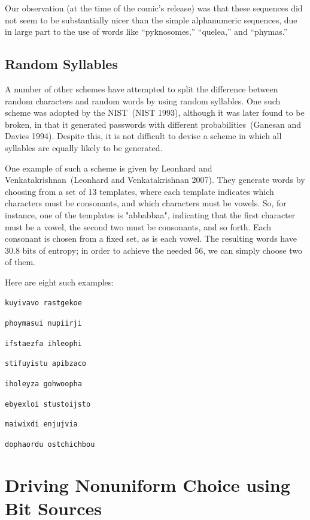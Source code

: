 \documentclass[preprint]{soups}
\newcommand{\sectionNewpage}{}
\newcommand{\Scribtexttt}[1]{{\texttt{#1}}}
\newenvironment{SingleColumn}{\begin{list}{}{\topsep=0pt\partopsep=0pt%
\listparindent=0pt\itemindent=0pt\labelwidth=0pt\leftmargin=0pt\rightmargin=0pt%
\itemsep=0pt\parsep=0pt}\item}{\end{list}}
\let\SOriginalthesubsection\thesubsection
\let\SOriginalthesubsubsection\thesubsubsection
\newcommand{\Ssection}[2]{\section[#1]{#2}\let\thesubsection\SOriginalthesubsection}
\newcommand{\Ssubsection}[2]{\subsection[#1]{#2}\let\thesubsubsection\SOriginalthesubsubsection}
\begin{document}
Our observation (at the time of the comic{'}s release) was
that these sequences did not seem to be substantially nicer
than the simple alphanumeric sequences, due in large part to
the use of words like {``}pyknosomes,{''} {``}quelea,{''} and
{``}phymas.{''}

\Ssubsection{Random Syllables}{Random Syllables}\label{t:x28part_x22Randomx5fSyllablesx22x29}

A number of other schemes have attempted to split the
difference between random characters and random words by
using random syllables. One such scheme was adopted by the
NIST~(NIST 1993), although it was later found to
be broken, in that it generated passwords with different
probabilities~(Ganesan and Davies 1994). Despite this, it is
not difficult to devise a scheme in which all syllables are
equally likely to be generated.

One example of such a scheme is given by Leonhard and
Venkatakrishnan~(Leonhard and Venkatakrishnan 2007). They generate words by
choosing from a set of 13 templates, where each template
indicates which characters must be consonants, and which
characters must be vowels. So, for instance, one of the
templates is "abbabbaa", indicating that the first character
must be a vowel, the second two must be consonants, and so
forth. Each consonant is chosen from a fixed set, as is each
vowel. The resulting words have 30.8 bits of entropy; in
order to achieve the needed 56, we can simply choose two of
them.

Here are eight such examples:

\begin{SingleColumn}\Scribtexttt{kuyivavo rastgekoe}

\Scribtexttt{phoymasui nupiirji}

\Scribtexttt{ifstaezfa ihleophi}

\Scribtexttt{stifuyistu apibzaco}

\Scribtexttt{iholeyza gohwoopha}

\Scribtexttt{ebyexloi stustoijsto}

\Scribtexttt{maiwixdi enjujvia}

\Scribtexttt{dophaordu ostchichbou}\end{SingleColumn}

\sectionNewpage

\Ssection{Driving Nonuniform Choice using Bit Sources}{Driving Nonuniform Choice using Bit Sources}\label{t:x28part_x22Drivingx5fNonuniformx5fChoicex5fusingx5fBitx5fSourcesx22x29}
\end{document}
